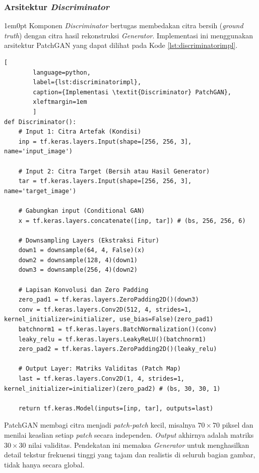 \subsubsection{Arsitektur \textit{Discriminator}}

\begin{adjustwidth}{1em}{0pt}
	\hspace{\parindent}Komponen \textit{Discriminator} bertugas membedakan citra bersih (\textit{ground truth}) dengan citra hasil rekonstruksi \textit{Generator}. Implementasi ini menggunakan arsitektur PatchGAN yang dapat dilihat pada Kode \ref{lst:discriminatorimpl}.
	
	\begin{lstlisting}[
		language=python,
		label={lst:discriminatorimpl},
		caption={Implementasi \textit{Discriminator} PatchGAN},
		xleftmargin=1em
		]
def Discriminator():
	# Input 1: Citra Artefak (Kondisi)
	inp = tf.keras.layers.Input(shape=[256, 256, 3], name='input_image')
	
	# Input 2: Citra Target (Bersih atau Hasil Generator)
	tar = tf.keras.layers.Input(shape=[256, 256, 3], name='target_image')
	
	# Gabungkan input (Conditional GAN)
	x = tf.keras.layers.concatenate([inp, tar]) # (bs, 256, 256, 6)
	
	# Downsampling Layers (Ekstraksi Fitur)
	down1 = downsample(64, 4, False)(x)
	down2 = downsample(128, 4)(down1)
	down3 = downsample(256, 4)(down2)
	
	# Lapisan Konvolusi dan Zero Padding
	zero_pad1 = tf.keras.layers.ZeroPadding2D()(down3)
	conv = tf.keras.layers.Conv2D(512, 4, strides=1, kernel_initializer=initializer, use_bias=False)(zero_pad1)
	batchnorm1 = tf.keras.layers.BatchNormalization()(conv)
	leaky_relu = tf.keras.layers.LeakyReLU()(batchnorm1)
	zero_pad2 = tf.keras.layers.ZeroPadding2D()(leaky_relu)
	
	# Output Layer: Matriks Validitas (Patch Map)
	last = tf.keras.layers.Conv2D(1, 4, strides=1, kernel_initializer=initializer)(zero_pad2) # (bs, 30, 30, 1)
	
	return tf.keras.Model(inputs=[inp, tar], outputs=last)
	\end{lstlisting}
	
	PatchGAN membagi citra menjadi \textit{patch-patch} kecil, misalnya $70 \times 70$ piksel dan menilai keaslian setiap \textit{patch} secara independen. \textit{Output} akhirnya adalah matriks $30 \times 30$ nilai validitas. Pendekatan ini memaksa \textit{Generator} untuk menghasilkan detail tekstur frekuensi tinggi yang tajam dan realistis di seluruh bagian gambar, tidak hanya secara global.
\end{adjustwidth}


